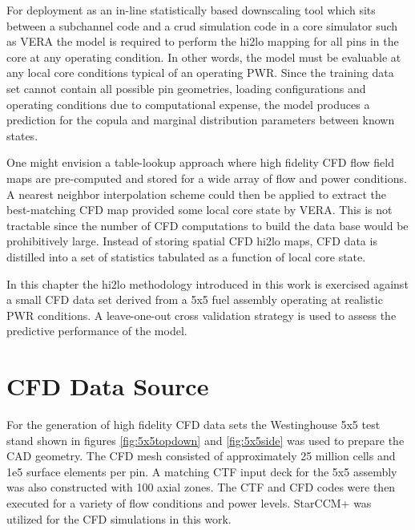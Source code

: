 \label{sec:ml_cfd}

For deployment as an in-line statistically based downscaling tool which sits between a subchannel code and a crud simulation code in a core simulator such as VERA the model is required to perform the hi2lo mapping for all pins in the core at any operating condition.  In other words, the model must be evaluable at any local core conditions typical of an operating PWR.  Since the training data set cannot contain all possible pin geometries, loading configurations and operating conditions due to computational expense, the model produces a prediction for the copula and marginal distribution parameters between known states.

One might envision a table-lookup approach where high fidelity CFD flow field maps are pre-computed and stored for a wide array of flow and power conditions.  A nearest neighbor interpolation scheme could then be applied to extract the best-matching CFD map provided some local core state by VERA.  This is not tractable since the number of CFD computations to build the data base would be prohibitively large.  Instead of storing spatial CFD hi2lo maps, CFD data is distilled into a set of statistics tabulated as a function of local core state.


In this chapter the hi2lo methodology introduced in this work is exercised against a small CFD data set derived from a 5x5 fuel assembly operating at realistic PWR conditions.  A leave-one-out cross validation strategy is used to assess the predictive performance of the model.


\section{CFD Data Source}
\label{sec:cfd_data_source}

For the generation of high fidelity CFD data sets the Westinghouse 5x5 test stand shown in figures \ref{fig:5x5topdown} and \ref{fig:5x5side} was used to prepare the CAD geometry.  The CFD mesh consisted of approximately 25 million cells and 1e5 surface elements per pin.  A matching CTF input deck for the 5x5 assembly was also constructed with 100 axial zones.  The CTF and CFD codes were then executed for a variety of flow conditions and power levels.  StarCCM+ was utilized for the CFD simulations in this work.

